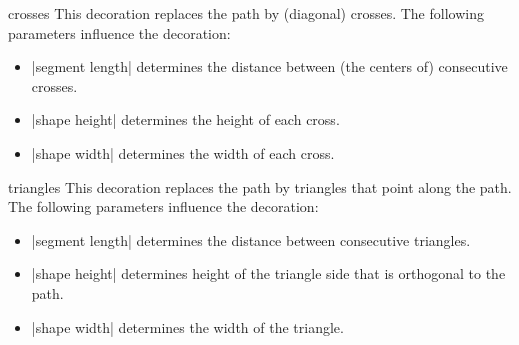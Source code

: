 \begin{decoration}{crosses}
  This decoration replaces the path by (diagonal) crosses. The
  following parameters influence the decoration:  
  \begin{itemize}
  \item |segment length|
    determines the distance between (the centers of) consecutive crosses.
  \item |shape height|
    determines the height of each cross.
  \item |shape width|
    determines the width of each cross.
  \end{itemize}
\begin{codeexample}[]
\end{codeexample}
\end{decoration}

\begin{decoration}{triangles}
  This decoration replaces the path by triangles that point along the
  path. The following parameters influence the decoration: 
  \begin{itemize}
  \item |segment length|
    determines the distance between consecutive triangles.
  \item |shape height|
    determines height of the triangle side that is orthogonal
    to the path.
  \item |shape width|
    determines the width of the triangle.
  \end{itemize}
\begin{codeexample}[]
\end{codeexample}
\end{decoration}


